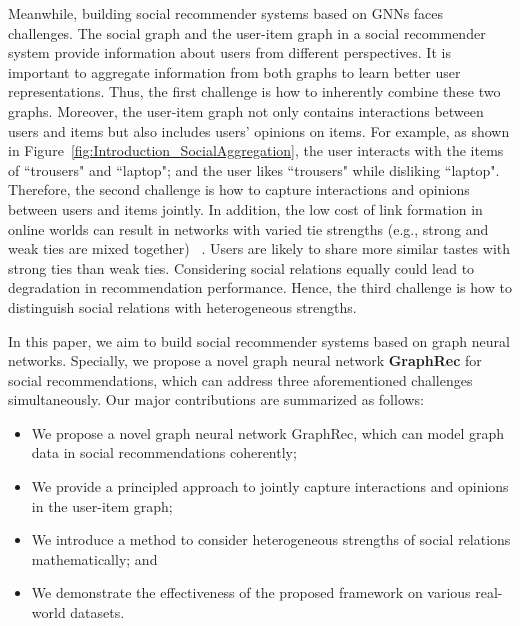 \documentclass[sigconf]{acmart} \copyrightyear{2019}
\begin{document}
Meanwhile, building social recommender systems based on GNNs faces challenges.  The social graph and the user-item graph in a social recommender system provide information about users from different perspectives. It is important to aggregate information from both graphs to learn better user representations. Thus, the first challenge is how to inherently combine these two graphs. Moreover, the user-item graph not only contains interactions between users and items but also includes users' opinions on items. For example, as shown in Figure~\ref{fig:Introduction_SocialAggregation}, the user interacts with the items of ``trousers" and ``laptop"; and the user likes
``trousers" while disliking ``laptop". Therefore, the second challenge is how to capture interactions and opinions between users and items jointly. In addition, the low cost of link formation in online worlds can result in networks with varied tie strengths (e.g., strong and weak ties are mixed together) ~\cite{xiang2010modeling}. Users are likely to share more similar tastes with strong ties than weak ties. Considering social relations equally could lead to degradation in recommendation performance. Hence, the third challenge is how to distinguish social relations with heterogeneous strengths.









In this paper, we aim to build social recommender systems based on graph neural networks. Specially, we propose a novel graph neural network \textbf{GraphRec} for social recommendations, which can address three aforementioned challenges simultaneously. Our major contributions are summarized as follows:
\begin{itemize}
\item We propose a novel graph neural network GraphRec, which can model graph data in social recommendations coherently;
\item We provide a principled approach to jointly capture interactions and opinions in the user-item graph;
\item We introduce a method to consider heterogeneous strengths of social relations mathematically; and
\item We demonstrate the effectiveness of the proposed framework on various real-world datasets.
\end{itemize}
\end{document}
